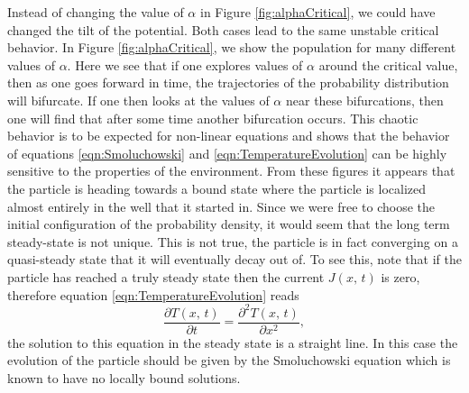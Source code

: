 Instead of changing the value of $\alpha$ in Figure \ref{fig:alphaCritical}, we could have changed the tilt of the potential. Both cases lead to the same unstable critical behavior. In Figure \ref{fig:alphaCritical}, we show the population for many different values of $\alpha$. Here we see that if one explores values of $\alpha$ around the critical value, then as one goes forward in time, the trajectories of the probability distribution will bifurcate. If one then looks at the values of $\alpha$ near these bifurcations, then one will find that after some time another bifurcation occurs. This chaotic behavior is to be expected for non-linear equations and shows that the behavior of equations \ref{eqn:Smoluchowski} and \ref{eqn:TemperatureEvolution} can be highly sensitive to the properties of the environment. From these figures it appears that the particle is heading towards a bound state where the particle is localized almost entirely in the well that it started in. Since we were free to choose the initial configuration of the probability density, it would seem that the long term steady-state is not unique. This is not true, the particle is in fact converging on a quasi-steady state that it will eventually decay out of. To see this, note that if the particle has reached a truly steady state then the current $J(x, \, t)$ is zero, therefore equation \ref{eqn:TemperatureEvolution} reads
\begin{equation}
\frac{\partial T(x, \, t)}{\partial t} = \frac{\partial^2 T(x, \, t)}{\partial x^2},
\end{equation}
the solution to this equation in the steady state is a straight line. In this case the evolution of the particle should be given by the Smoluchowski equation which is known to have no locally bound solutions.

